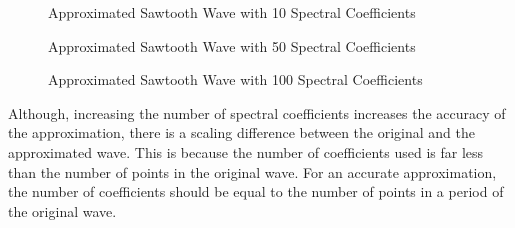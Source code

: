 \documentclass[10pt,a4paper, margin=1in]{article}
\begin{document}
\begin{enumerate}
\begin{enumerate}
\begin{figure}[H]
        
    \end{figure}
    \begin{figure}[H]
        \centering
        \caption{Approximated Sawtooth Wave with 10 Spectral Coefficients}
        
    \end{figure}
    \begin{figure}[H]
        \centering
        \caption{Approximated Sawtooth Wave with 50 Spectral Coefficients}
        
    \end{figure}
    \begin{figure}[H]
        \centering
        \caption{Approximated Sawtooth Wave with 100 Spectral Coefficients}
        
    \end{figure}
    Although, increasing the number of spectral coefficients increases the accuracy of the approximation, there is a scaling difference between the original and the approximated wave. This is because the number of coefficients used is far less than the number of points in the original wave. For an accurate approximation, the number of coefficients should be equal to the number of points in a period of the original wave.
\end{enumerate}
\end{enumerate}
\end{document}
